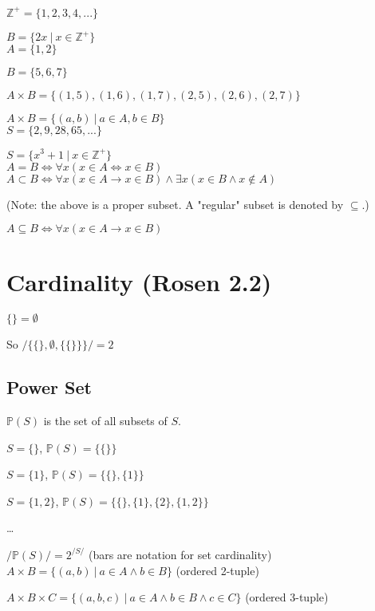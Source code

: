 \documentclass[english,openany]{book}
\begin{document}
	$\mathbb Z^+ = \{ 1,2,3,4,... \}$

	$B = \{ 2x \ | \ x \in \mathbb Z^+\}$ \\

	$A = \{1,2\}$

	$B = \{5,6,7\}$

	$A \times B = \{ (1,5),(1,6),(1,7),(2,5),(2,6),(2,7) \}$

	$A \times B = \{ (a,b) \ |\ a \in A, b \in B \}$\\

	$S = \{2,9,28,65,...\}$

	$S = \{ x^3 + 1 \ | \ x \in \mathbb Z^+ \}$\\

	$A = B \iff \forall x (x \in A \iff x \in B)$\\

	$A \subset B \iff \forall x (x \in A \rightarrow x \in B) \wedge \exists x (x \in B \wedge x \not\in A)$

	(Note: the above is a proper subset. A "regular" subset is denoted by $\subseteq$.)

	$A \subseteq B \iff \forall x (x \in A \rightarrow x \in B)$

	\section{Cardinality (Rosen 2.2)}

	$\{\} = \emptyset$

	So $/\{ \{\}, \emptyset, \{\{\}\} \}/ = 2$\\

	\subsection{Power Set}

	$\mathbb P (S)$ is the set of all subsets of $S$.

	$S = \{\}$, $\mathbb P (S) = \{ \{ \} \}$

	$S = \{1\}$, $\mathbb P (S) = \{  \{\}, \{1\}  \}$

	$S = \{1, 2\}$, $\mathbb P (S) = \{  \{\},  \{ 1 \}, \{ 2 \},  \{1, 2\}  \}$

	\dots

	$/ \mathbb P(S)/ = 2^{ /S/ }$ (bars are notation for set cardinality)\\

	$A \times B = \{ (a,b)\ |\ a \in A \wedge b \in B \}$ (ordered 2-tuple)

	$A \times B \times C = \{ (a,b,c)\ |\ a \in A \wedge b \in B \wedge c \in C \}$ (ordered 3-tuple)
\end{document}
